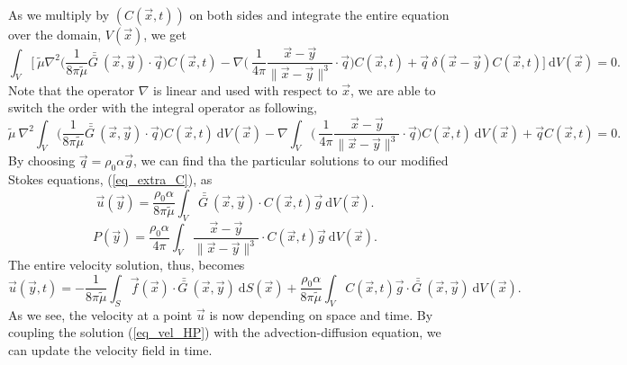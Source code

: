 As we multiply by $\left( C(\vec{x}, t) \right)$ on both sides and integrate the entire equation over the domain, $V(\vec{x})$, we get
\begin{equation}
	\int_{V}
	\biggl[
	\ \tilde{\mu} \nabla^2 
	\biggl( \frac{1}{8\pi \tilde{\mu}}  \bar{\bar{G \ }}(\vec{x}, \vec{y})
	\cdot  \vec{q} \biggr)
	C(\vec{x}, t)
	-
	\nabla \biggl(\ \frac{1}{4\pi }  
	\frac{\vec{x} - \vec{y}}{\| \vec{x} - \vec{y}\|^3}
	\cdot  \vec{q} \biggr)
	C(\vec{x}, t)
	+ \vec{q} \ \delta \left(\vec{x} - \vec{y} \right)
	C(\vec{x}, t)
	\biggr]
	\ \textrm{d}V(\vec{x}) = 0 .
\label{eq_single_stokes_sub2}
\end{equation}
Note that the operator $\nabla$ is linear and used with respect to $\vec{x}$, we are able to switch the order with the integral operator as following,
\begin{equation}
	\tilde{\mu} \ \nabla^2 
	\int_{V}
	\biggl( \frac{1}{8\pi \tilde{\mu}}  \bar{\bar{G \ }}(\vec{x}, \vec{y})
	\cdot  \vec{q} \biggr)
	C(\vec{x}, t)
	\ \textrm{d}V(\vec{x})
	-
	\nabla 
	\int_{V}
	\biggl(\ \frac{1}{4\pi }  
	\frac{\vec{x} - \vec{y}}{\| \vec{x} - \vec{y}\|^3}
	\cdot  \vec{q} \biggr)
	C(\vec{x}, t)
	\ \textrm{d}V(\vec{x})
	+\vec{q} C(\vec{x}, t) = 0 .
\label{eq_single_stokes_sub3}
\end{equation}
By choosing $\vec{q} = \rho_0 \alpha \vec{g}$, we can find
tha the particular solutions to our modified Stokes equations, (\ref{eq_extra_C}), as
\begin{equation}
	\vec{u} (\vec{y}) =
	 \frac{\rho_0 \alpha }{8\pi \tilde{\mu}}
	\int_{V}  \bar{\bar{G \ }}(\vec{x}, \vec{y})
	\cdot  C(\vec{x}, t) \vec{g} 
	\ \textrm{d}V(\vec{x}).
\label{eq_fund_soln_unit}
\end{equation}
\begin{equation}
	P(\vec{y}) = 
	\frac{\rho_0 \alpha }{4\pi }  
	\int_{V}
	\frac{\vec{x} - \vec{y}}{\| \vec{x} - \vec{y}\|^3}
	\cdot 
	C(\vec{x}, t) \vec{g} 
	\ \textrm{d}V(\vec{x}).
\label{eq_fund_soln_p}
\end{equation}
The entire velocity solution, thus, becomes
\begin{equation}
	 \vec{u} \left(\vec{y}, t \right) =
	 - \frac{1}{8 \pi \tilde{\mu}} \int_{S}  
		 \vec{f}(\vec{x}) 
		 \cdot \bar{\bar{G \ }} (\vec{x},\vec{y}) 
		 \ \textrm{d}S(\vec{x})
	+ \frac{ \rho_0 \alpha  }{8\pi \tilde{\mu}} \int_V  C \left(\vec{x},  t \right) \vec{g} \cdot 
	\bar{\bar{G \ }}(\vec{x}, \vec{y} ) 
	\ \text{d}V(\vec{x}).
\label{eq_vel_HP}
\end{equation}
As we see, the velocity at a point $\vec{u}$ is now depending on space and time. By coupling the solution (\ref{eq_vel_HP}) with the advection-diffusion equation, we can update the velocity field in time. 

